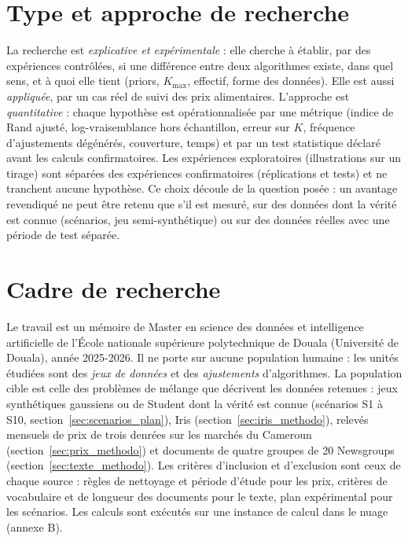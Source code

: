 \section{Type et approche de recherche}\label{sec:type_recherche}
La recherche est \emph{explicative et expérimentale} : elle cherche à établir, par des expériences contrôlées, si une différence entre deux algorithmes existe, dans quel sens, et à quoi elle tient (priors, $K_{\max}$, effectif, forme des données). Elle est aussi \emph{appliquée}, par un cas réel de suivi des prix alimentaires. L'approche est \emph{quantitative} : chaque hypothèse est opérationnalisée par une métrique (indice de Rand ajusté, log-vraisemblance hors échantillon, erreur sur $K$, fréquence d'ajustements dégénérés, couverture, temps) et par un test statistique déclaré avant les calculs confirmatoires. Les expériences exploratoires (illustrations sur un tirage) sont séparées des expériences confirmatoires (réplications et tests) et ne tranchent aucune hypothèse. Ce choix découle de la question posée : un avantage revendiqué ne peut être retenu que s'il est mesuré, sur des données dont la vérité est connue (scénarios, jeu semi-synthétique) ou sur des données réelles avec une période de test séparée.

\section{Cadre de recherche}\label{sec:cadre_recherche}
Le travail est un mémoire de Master en science des données et intelligence artificielle de l'École nationale supérieure polytechnique de Douala (Université de Douala), année 2025-2026. Il ne porte sur aucune population humaine : les unités étudiées sont des \emph{jeux de données} et des \emph{ajustements} d'algorithmes. La population cible est celle des problèmes de mélange que décrivent les données retenues : jeux synthétiques gaussiens ou de Student dont la vérité est connue (scénarios S1 à S10, section~\ref{sec:scenarios_plan}), Iris (section~\ref{sec:iris_methodo}), relevés mensuels de prix de trois denrées sur les marchés du Cameroun (section~\ref{sec:prix_methodo}) et documents de quatre groupes de 20 Newsgroups (section~\ref{sec:texte_methodo}). Les critères d'inclusion et d'exclusion sont ceux de chaque source : règles de nettoyage et période d'étude pour les prix, critères de vocabulaire et de longueur des documents pour le texte, plan expérimental pour les scénarios. Les calculs sont exécutés sur une instance de calcul dans le nuage (annexe B).

